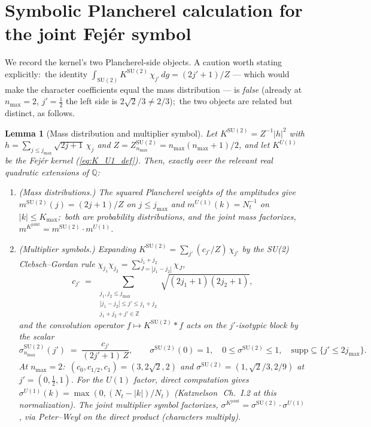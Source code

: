 \documentclass[11pt,a4paper]{article}
\theoremstyle{plain}
\newtheorem{lemma}[theorem]{Lemma}
\theoremstyle{definition}
\newcommand{\nmax}{n_{\max}}
\newcommand{\Nt}{N_{t}}
\newcommand{\Kmax}{K_{\max}}
\newcommand{\Q}{\mathbb{Q}}
\newcommand{\SU}{\mathrm{SU}}
\newcommand{\Uone}{U(1)}
\newcommand{\Kjoint}{K^{\mathrm{joint}}}
\newcommand{\KSU}{K^{\SU(2)}}
\newcommand{\KU}{K^{\Uone}}
\begin{document}
\appendix
\section{Symbolic Plancherel calculation for the joint Fej\'er symbol}
\label{app:plancherel}

We record the kernel's two Plancherel-side objects. A caution
worth stating explicitly:\ the identity
$\int_{\SU(2)} \KSU\,\chi_{j'}\,dg = (2j'+1)/Z$ — which would make
the character coefficients equal the mass distribution — is
\emph{false} (already at $\nmax = 2$, $j' = \tfrac12$ the left side
is $2\sqrt2/3 \ne 2/3$);\ the two objects are related but distinct,
as follows.

\begin{lemma}[Mass distribution and multiplier symbol]
\label{lem:plancherel_factor}
Let $\KSU = Z^{-1}|h|^{2}$ with
$h = \sum_{j \le j_{\max}}\sqrt{2j+1}\,\chi_{j}$ and
$Z = Z^{\SU(2)}_{\nmax} = \nmax(\nmax+1)/2$, and let $\KU$ be the
Fej\'er kernel (\ref{eq:K_U1_def}). Then, exactly over the relevant
real quadratic extensions of $\Q$:
\begin{enumerate}
\item[(a)] \emph{(Mass distributions.)} The squared Plancherel weights
of the amplitudes give $m^{\SU(2)}(j) = (2j+1)/Z$ on $j \le j_{\max}$
and $m^{\Uone}(k) = \Nt^{-1}$ on $|k| \le \Kmax$;\ both are
probability distributions, and the joint mass factorizes,
$m^{\Kjoint} = m^{\SU(2)} \cdot m^{\Uone}$.
\item[(b)] \emph{(Multiplier symbols.)} Expanding
$\KSU = \sum_{j'} (c_{j'}/Z)\,\chi_{j'}$ by the SU(2) Clebsch--Gordan
rule $\chi_{j_1}\chi_{j_2} = \sum_{J=|j_1-j_2|}^{j_1+j_2}\chi_{J}$,
\begin{equation*}
   c_{j'} \;=\; \sum_{\substack{j_1, j_2 \le j_{\max} \\
                |j_1 - j_2| \le j' \le j_1 + j_2 \\
                j_1 + j_2 + j' \in \mathbb{Z}}}
                \sqrt{(2j_1+1)(2j_2+1)},
\end{equation*}
and the convolution operator $f \mapsto \KSU \ast f$ acts on the
$j'$-isotypic block by the scalar
\begin{equation*}
   \sigma^{\SU(2)}_{\nmax}(j') \;=\; \frac{c_{j'}}{(2j'+1)\,Z},
   \qquad
   \sigma^{\SU(2)}(0) = 1, \quad 0 \le \sigma^{\SU(2)} \le 1, \quad
   \mathrm{supp} \subseteq \{j' \le 2j_{\max}\}.
\end{equation*}
At $\nmax = 2$:\ $(c_{0}, c_{1/2}, c_{1}) = (3, 2\sqrt2, 2)$ and
$\sigma^{\SU(2)} = (1, \sqrt2/3, 2/9)$ at $j' = (0, \tfrac12, 1)$.
For the $\Uone$ factor, direct computation gives
$\sigma^{\Uone}(k) = \max(0, (\Nt - |k|)/\Nt)$
(Katznelson~\cite{katznelson2004}\,Ch.~I.2 at this normalization).
The joint multiplier symbol factorizes,
$\sigma^{\Kjoint} = \sigma^{\SU(2)} \cdot \sigma^{\Uone}$, via
Peter--Weyl on the direct product (characters multiply).
\end{enumerate}
\end{lemma}
\end{document}
